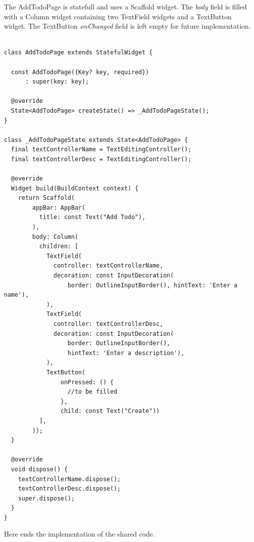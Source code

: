 The AddTodoPage is statefull and uses a Scaffold widget. The \textit{body} field is filled with a Column widget containing two TextField widgets and a TextButton widget. The TextButton \textit{onChanged }field is left empty for future implementation.
	\mbox{}
	\begin{code}
	 \mbox{}
			\label{code:2.14}
	\begin{verbatim}

class AddTodoPage extends StatefulWidget {

  const AddTodoPage({Key? key, required})
      : super(key: key);

  @override
  State<AddTodoPage> createState() => _AddTodoPageState();
}

class _AddTodoPageState extends State<AddTodoPage> {
  final textControllerName = TextEditingController();
  final textControllerDesc = TextEditingController();

  @override
  Widget build(BuildContext context) {
    return Scaffold(
        appBar: AppBar(
          title: const Text("Add Todo"),
        ),
        body: Column(
          children: [
            TextField(
              controller: textControllerName,
              decoration: const InputDecoration(
                  border: OutlineInputBorder(), hintText: 'Enter a name'),
            ),
            TextField(
              controller: textControllerDesc,
              decoration: const InputDecoration(
                  border: OutlineInputBorder(),
                  hintText: 'Enter a description'),
            ),
            TextButton(
                onPressed: () {
                  //to be filled
                },
                child: const Text("Create"))
          ],
        ));
  }

  @override
  void dispose() {
    textControllerName.dispose();
    textControllerDesc.dispose();
    super.dispose();
  }
}

	\end{verbatim}
	\end{code}
Here ends the implementation of the shared code.